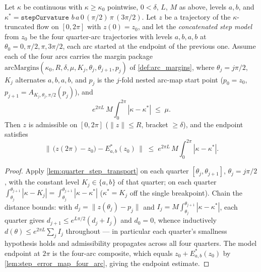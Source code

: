 \begin{lemma}
  \label{lem:step_model_transport}
  Let $\kappa$ be continuous with $\kappa\ge\kappa_0$ pointwise, $0<\delta$, $L$, $M$ as
  above, levels $a,b$, and $\kappa^\ast=\texttt{stepCurvature } b\,a\,0\,(\pi/2)\,\pi\,
  (3\pi/2)$. Let $z$ be a trajectory of the $\kappa$-truncated flow on $[0,2\pi]$ with
  $z(0)=z_0$, and let the \emph{concatenated step model} from $z_0$ be the four
  quarter-arc trajectories with levels $a,b,a,b$ at $\theta_0=0,\pi/2,\pi,3\pi/2$, each
  arc started at the endpoint of the previous one. Assume each of the four arcs
  carries the margin package
  $\mathrm{arcMargins}(\kappa_0,R,\delta,\mu,K_j,\theta_j,\theta_{j+1},p_j)$ of
  \cref{def:arc_margins}, where $\theta_j=j\pi/2$, $K_j$ alternates $a,b,a,b$, and
  $p_j$ is the $j$-fold nested arc-map start point ($p_0=z_0$,
  $p_{j+1}=A_{K_j,\theta_j,\pi/2}(p_j)$), and
  \[
    e^{2\pi L}\,M\!\int_0^{2\pi}\!|\kappa-\kappa^\ast|\;\le\;\mu .
  \]
  Then $z$ is admissible on $[0,2\pi]$ ($\|z\|\le R$, bracket $\ge\delta$), and the
  endpoint satisfies
  \[
    \bigl\|\,\bigl(z(2\pi)-z_0\bigr)-E^\ast_{a,b}(z_0)\,\bigr\|
    \;\le\;e^{2\pi L}\,M\!\int_0^{2\pi}\!|\kappa-\kappa^\ast| .
  \]
\end{lemma}

\begin{proof}
  \leanok
  Apply \cref{lem:quarter_step_transport} on each quarter $[\theta_j,\theta_{j+1}]$,
  $\theta_j=j\pi/2$, with the constant level $K_j\in\{a,b\}$ of that quarter; on each
  quarter $\int_{\theta_j}^{\theta_{j+1}}|\kappa-K_j|=\int_{\theta_j}^{\theta_{j+1}}
  |\kappa-\kappa^\ast|$ ($\kappa^\ast=K_j$ off the single breakpoint). Chain the distance
  bounds: with $d_j=\|z(\theta_j)-p_j\|$ and $I_j=M\int_{\theta_j}^{
  \theta_{j+1}}|\kappa-\kappa^\ast|$, each quarter gives $d_{j+1}\le e^{L\pi/2}(d_j+I_j)$
  and $d_0=0$, whence inductively $d(\theta)\le e^{2\pi L}\sum_j I_j$ throughout —
  in particular each quarter's smallness hypothesis holds and admissibility propagates
  across all four quarters. The model endpoint at $2\pi$ is the four-arc composite,
  which equals $z_0+E^\ast_{a,b}(z_0)$ by \cref{lem:step_error_map_four_arc}, giving
  the endpoint estimate.
\end{proof}

